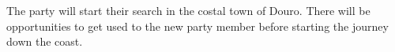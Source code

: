 The party will start their search in the costal town of Douro.
There will be opportunities to get used to the new party member before starting the journey down the coast.
